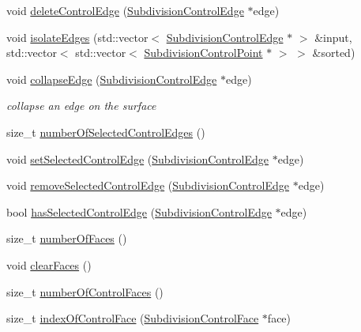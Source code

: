\begin{DoxyCompactItemize}
\item 
void \hyperlink{classShipCAD_1_1SubdivisionSurface_ae45fc2694977c8fbae54ac2e0e067d1f}{delete\-Control\-Edge} (\hyperlink{classShipCAD_1_1SubdivisionControlEdge}{Subdivision\-Control\-Edge} $\ast$edge)
\item 
void \hyperlink{classShipCAD_1_1SubdivisionSurface_a975c97ca338eb2aaaa3dcc0640611a95}{isolate\-Edges} (std\-::vector$<$ \hyperlink{classShipCAD_1_1SubdivisionControlEdge}{Subdivision\-Control\-Edge} $\ast$ $>$ \&input, std\-::vector$<$ std\-::vector$<$ \hyperlink{classShipCAD_1_1SubdivisionControlPoint}{Subdivision\-Control\-Point} $\ast$ $>$ $>$ \&sorted)
\item 
void \hyperlink{classShipCAD_1_1SubdivisionSurface_acb0b35c10fe6ab3c348f8435a1ca844d}{collapse\-Edge} (\hyperlink{classShipCAD_1_1SubdivisionControlEdge}{Subdivision\-Control\-Edge} $\ast$edge)
\begin{DoxyCompactList}\small\item\em collapse an edge on the surface \end{DoxyCompactList}\item 
size\-\_\-t \hyperlink{classShipCAD_1_1SubdivisionSurface_a28f394042987ccc30d947ddd98a62574}{number\-Of\-Selected\-Control\-Edges} ()
\item 
void \hyperlink{classShipCAD_1_1SubdivisionSurface_ae1ceb8323935d0734fe4dc9c324aca16}{set\-Selected\-Control\-Edge} (\hyperlink{classShipCAD_1_1SubdivisionControlEdge}{Subdivision\-Control\-Edge} $\ast$edge)
\item 
void \hyperlink{classShipCAD_1_1SubdivisionSurface_a579077d742f9afc4e1d4ad20ef5a2184}{remove\-Selected\-Control\-Edge} (\hyperlink{classShipCAD_1_1SubdivisionControlEdge}{Subdivision\-Control\-Edge} $\ast$edge)
\item 
bool \hyperlink{classShipCAD_1_1SubdivisionSurface_a3f7856ea95b0c881a1171845c1dc817e}{has\-Selected\-Control\-Edge} (\hyperlink{classShipCAD_1_1SubdivisionControlEdge}{Subdivision\-Control\-Edge} $\ast$edge)
\item 
size\-\_\-t \hyperlink{classShipCAD_1_1SubdivisionSurface_a9f67bb8bbd3a8f61a2b4abacc0cf10e4}{number\-Of\-Faces} ()
\item 
void \hyperlink{classShipCAD_1_1SubdivisionSurface_abf11847b9df1bc590c6c51d292430dd5}{clear\-Faces} ()
\item 
size\-\_\-t \hyperlink{classShipCAD_1_1SubdivisionSurface_a2fb486ba7285a42ae7fdab6e6c289fc5}{number\-Of\-Control\-Faces} ()
\item 
size\-\_\-t \hyperlink{classShipCAD_1_1SubdivisionSurface_aee61b8795a0f16c47df83f0ef0abd2e7}{index\-Of\-Control\-Face} (\hyperlink{classShipCAD_1_1SubdivisionControlFace}{Subdivision\-Control\-Face} $\ast$face)

\end{DoxyCompactItemize}
